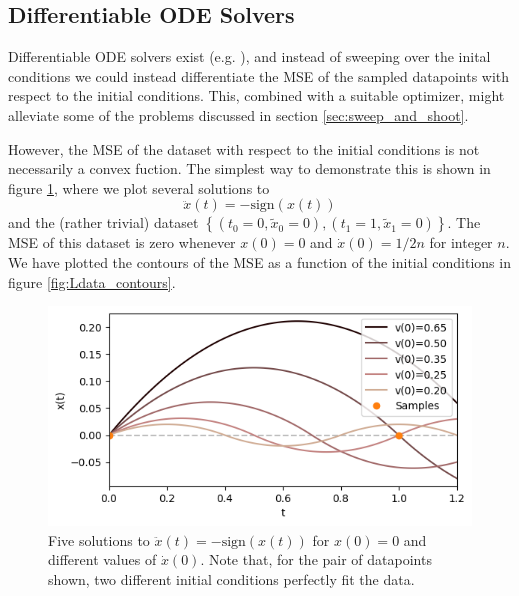 \documentclass{article}
\begin{document}
\subsection{Differentiable ODE Solvers}

Differentiable ODE solvers exist (e.g. \cite{torchdiffeq}), and instead of sweeping over the inital conditions we could instead differentiate the MSE of the sampled datapoints with respect to the initial conditions.
This, combined with a suitable optimizer, might alleviate some of the problems discussed in section \ref{sec:sweep_and_shoot}. %

However, the MSE of the dataset with respect to the initial conditions is not necessarily a convex fuction.
The simplest way to demonstrate this is shown in figure \ref{fig:silly_oscillator_solns}, where we plot several solutions to
$$
\label{eq:silly_oscillator}
\ddot{x}(t) = - \mathrm{sign} (x(t))
$$
and the (rather trivial) dataset $\left\{ (t_0=0, \tilde{x}_0=0), (t_1 = 1, \tilde{x}_1 = 0) \right\}$.
The MSE of this dataset is zero whenever $x(0) = 0$ and $\dot{x}(0) = 1/2n$ for integer $n$.
We have plotted the contours of the MSE as a function of the initial conditions in figure \ref{fig:Ldata_contours}.

\begin{figure}
\includegraphics{images/alternative_methods/silly_oscillator_solns.png}
\centering
\caption{
Five solutions to $\ddot{x}(t) = -\mathrm{sign} (x(t))$ for $x(0) = 0$ and different values of $\dot{x}(0)$.
Note that, for the pair of datapoints shown, two different initial conditions perfectly fit the data.
}
\label{fig:silly_oscillator_solns}
\end{figure}
\end{document}
